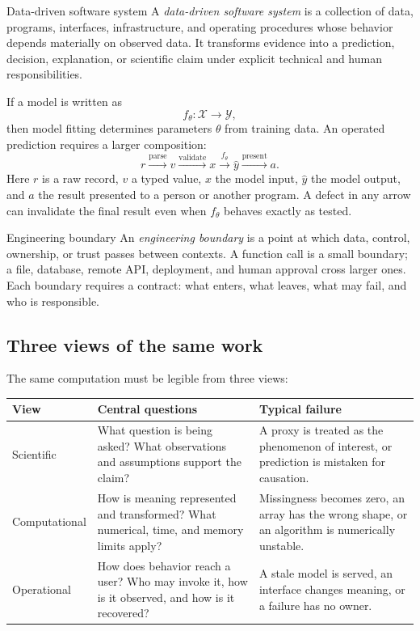 \begin{definitionbox}{Data-driven software system}
A \emph{data-driven software system} is a collection of data, programs,
interfaces, infrastructure, and operating procedures whose behavior depends
materially on observed data. It transforms evidence into a prediction,
decision, explanation, or scientific claim under explicit technical and human
responsibilities.
\end{definitionbox}

If a model is written as
\[
  f_{\theta}: \mathcal{X} \longrightarrow \mathcal{Y},
\]
then model fitting determines parameters \(\theta\) from training data. An
operated prediction requires a larger composition:
\[
  r
  \xrightarrow{\text{parse}}
  v
  \xrightarrow{\text{validate}}
  x
  \xrightarrow{f_{\theta}}
  \widehat{y}
  \xrightarrow{\text{present}}
  a.
\]
Here \(r\) is a raw record, \(v\) a typed value, \(x\) the model input,
\(\widehat{y}\) the model output, and \(a\) the result presented to a person or
another program. A defect in any arrow can invalidate the final result even
when \(f_{\theta}\) behaves exactly as tested.

\begin{definitionbox}{Engineering boundary}
An \emph{engineering boundary} is a point at which data, control, ownership, or
trust passes between contexts. A function call is a small boundary; a file,
database, remote API, deployment, and human approval cross larger ones. Each
boundary requires a contract: what enters, what leaves, what may fail, and who
is responsible.
\end{definitionbox}

\subsection{Three views of the same work}

The same computation must be legible from three views:

\begin{center}
\small
\begin{tabularx}{\textwidth}{@{}p{}X X@{}}
\toprule
\textbf{View} & \textbf{Central questions} & \textbf{Typical failure} \\
\midrule
Scientific & What question is being asked? What observations and assumptions
support the claim? & A proxy is treated as the phenomenon of interest, or
prediction is mistaken for causation. \\
Computational & How is meaning represented and transformed? What numerical,
time, and memory limits apply? & Missingness becomes zero, an array has the
wrong shape, or an algorithm is numerically unstable. \\
Operational & How does behavior reach a user? Who may invoke it, how is it
observed, and how is it recovered? & A stale model is served, an interface
changes meaning, or a failure has no owner. \\
\bottomrule
\end{tabularx}
\end{center}


